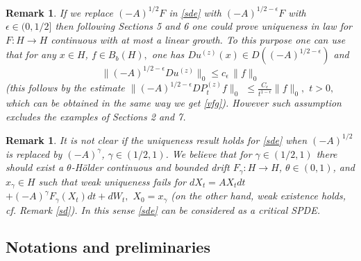 \documentclass[preprint]{imsart}
\newtheorem{remark}[theorem]{Remark}
\begin{document}
\begin{remark} {\em  If we replace $(-A)^{1/2} F$  in \eqref{sde} with $(-A)^{1/2 - \epsilon}F$ with $\epsilon 
\in (0, 1/2]$ then following    Sections 5 and 6  one could  prove uniqueness in law for $F: H \to H$  continuous with at most a linear growth. To this purpose one can use that for any $x \in H$, $f \in B_b(H),$   one   has $ D u^{(z)}(x) \in D( (-A)^{1/2 - \epsilon})$ and 
 $$  
\|   (-A)^{1/2 - \epsilon} D u^{(z)}  \|_{0} \le {c_{\epsilon}}   \, \| f \|_0 
 $$
(this follows by the estimate $\|   (-A)^{1/2 - \epsilon} D P_t^{(z)} f \|_{0} $ $\le \frac{C_{\epsilon}} {t^{1-\epsilon}} \| f \|_0,$ $ t>0,$ which can be obtained  in the same way we get     \eqref{vfg}).  However such assumption  excludes the  examples of Sections 2 and 7.} 
\end{remark} 
  

\begin{remark} \label{mai}   {\em      It is not clear if the   uniqueness result holds for \eqref{sde} when $(-A)^{1/2}$ is replaced by $(-A)^{\gamma}$, $\gamma \in (1/2,1)$.
 We believe that  for  $\gamma \in (1/2,1)$ there  should exist a $\theta$-H\"older continuous and bounded drift $F_{\gamma}: H \to H$, $\theta \in (0,1)$,  and $x_{\gamma} \in H$ such that weak uniqueness fails for  
  $dX_t = AX_t dt $ $+ (-A)^{\gamma}F_{\gamma} (X_t)dt +  dW_t,$ $  X_0 =x_{\gamma} $ (on the other hand, weak existence holds, cf. Remark \ref{sd}). 
 In this sense \eqref{sde}  can be considered   as a  critical SPDE.}
\end{remark}
  

 
\subsection{ Notations and preliminaries}
\end{document}
